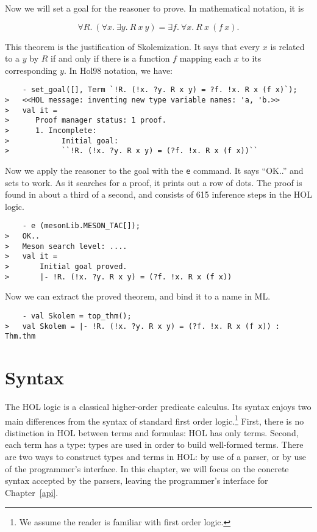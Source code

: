 \documentclass[12pt,fleqn,a4paper]{report}
\begin{document}
Now we will set a goal for the reasoner to prove. In mathematical
notation, it is

\[\forall R.\ (\forall x.\  \exists y.\ R\ x\ y) = \exists f.\ \forall
 x.\ R\ x\ (f\ x).\]

 This theorem is the justification of Skolemization. It says that
every $x$ is related to a $y$ by $R$ if and only if there is
a function $f$ mapping each $x$ to its corresponding $y$. In Hol98
notation, we have:
\begin{verbatim}
    - set_goal([], Term `!R. (!x. ?y. R x y) = ?f. !x. R x (f x)`);
>   <<HOL message: inventing new type variable names: 'a, 'b.>>
>   val it =
>      Proof manager status: 1 proof.
>      1. Incomplete:
>            Initial goal:
>            ``!R. (!x. ?y. R x y) = (?f. !x. R x (f x))``
\end{verbatim}

Now we apply the reasoner to the goal with the \verb+e+ command. It says
``OK..'' and sets to work. As it searches for a proof, it prints out a
row of dots. The proof is found in about a third of a second, and
consists of 615 inference steps in the HOL logic.
\begin{verbatim}
    - e (mesonLib.MESON_TAC[]);
>   OK..
>   Meson search level: ....
>   val it =
>       Initial goal proved.
>       |- !R. (!x. ?y. R x y) = (?f. !x. R x (f x))
\end{verbatim}

Now we can extract the proved theorem, and
bind it to a name in ML.
\begin{verbatim}
    - val Skolem = top_thm();
>   val Skolem = |- !R. (!x. ?y. R x y) = (?f. !x. R x (f x)) : Thm.thm
\end{verbatim}


\chapter{Syntax}

The HOL logic is a classical higher-order predicate calculus. Its
syntax enjoys two main differences from the syntax of standard first
order logic.\footnote{We assume the reader is familiar with first
  order logic.}  First, there is no distinction in HOL between terms
and formulas: HOL has only terms. Second, each term has a type: types
are used in order to build well-formed terms. There are two ways to
construct types and terms in HOL: by use of a parser, or by use of the
programmer's interface. In this chapter, we will focus on the concrete
syntax accepted by the parsers, leaving the programmer's interface for
Chapter~\ref{api}.
\end{document}
